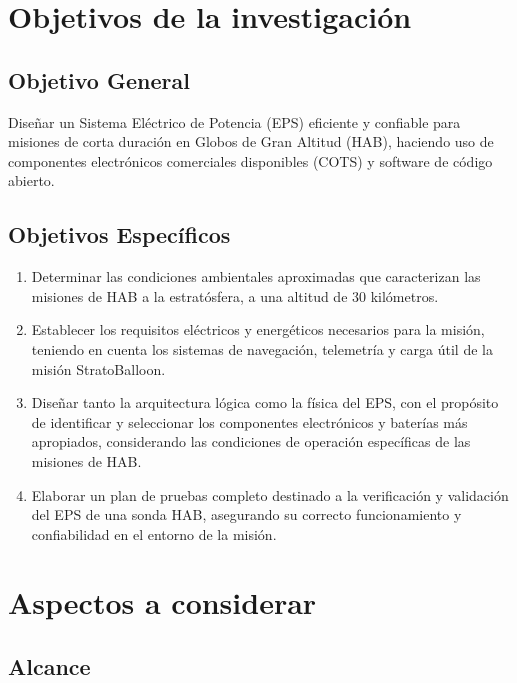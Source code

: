 \newpage

\section{Objetivos de la investigación}
\vspace{1 cm}
\subsection{Objetivo General}
Diseñar un Sistema Eléctrico de Potencia (EPS) eficiente y confiable para misiones de corta duración en Globos de Gran Altitud (HAB), haciendo uso de componentes electrónicos comerciales disponibles (COTS) y software de código abierto.

\subsection{Objetivos Específicos}
\begin{enumerate}
    \item Determinar las condiciones ambientales aproximadas que caracterizan las misiones de HAB a la estratósfera, a una altitud de 30 kilómetros. 

    \item Establecer los requisitos eléctricos y energéticos necesarios para la misión, teniendo en cuenta los sistemas de navegación, telemetría y carga útil de la misión StratoBalloon.

    \item Diseñar tanto la arquitectura lógica como la física del EPS, con el propósito de identificar y seleccionar los componentes electrónicos y baterías más apropiados, considerando las condiciones de operación específicas de las misiones de HAB.

    \item Elaborar un plan de pruebas completo destinado a la verificación y validación del EPS de una sonda HAB, asegurando su correcto funcionamiento y confiabilidad en el entorno de la misión.
\end{enumerate}
\newpage


\section{Aspectos a considerar}
\vspace{1 cm}

\subsection{Alcance}

